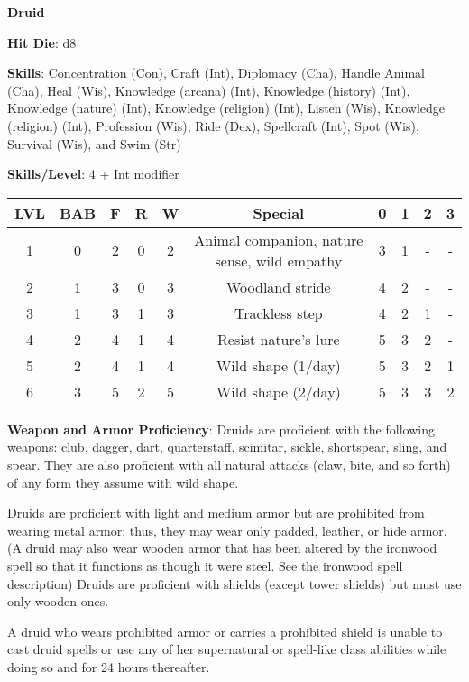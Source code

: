 \textbf{\huge{Druid}}

\textbf{Hit Die}: d8

\textbf{Skills}: Concentration (Con), Craft (Int), Diplomacy (Cha), Handle Animal (Cha), Heal (Wis), Knowledge (arcana) (Int), Knowledge (history) (Int), Knowledge (nature) (Int), Knowledge (religion) (Int), Listen (Wis), Knowledge (religion) (Int), Profession (Wis), Ride (Dex), Spellcraft (Int), Spot (Wis), Survival (Wis), and Swim (Str)

\textbf{Skills/Level}: 4 + Int modifier

\begin{center}
\begin{adjustwidth}{-4cm}{}
\begin{small}
\begin{tabular}{| c | c | c | c | c | c | c | c | c | c |}
\hline
LVL &BAB &F &R &W &Special &0 &1 &2 &3 \\
\hline
1 &0 &2 &0 &2 &Animal companion, nature sense, wild empathy &3 &1 &- &- \\
2 &1 &3 &0 &3 &Woodland stride &4 &2 &- &- \\
3 &1 &3 &1 &3 &Trackless step &4 &2 &1 &- \\
4 &2 &4 &1 &4 &Resist nature's lure &5 &3 &2 &- \\
5 &2 &4 &1 &4 &Wild shape (1/day) &5 &3 &2 &1 \\
6 &3 &5 &2 &5 &Wild shape (2/day) &5 &3 &3 &2 \\
\hline
\end{tabular}
\end{small}
\end{adjustwidth}
\end{center}

\textbf{Weapon and Armor Proficiency}: Druids are proficient with the following weapons: club, dagger, dart, quarterstaff, scimitar, sickle, shortspear, sling, and spear. They are also proficient with all natural attacks (claw, bite, and so forth) of any form they assume with wild shape.

Druids are proficient with light and medium armor but are prohibited from wearing metal armor; thus, they may wear only padded, leather, or hide armor. (A druid may also wear wooden armor that has been altered by the ironwood spell so that it functions as though it were steel. See the ironwood spell description) Druids are proficient with shields (except tower shields) but must use only wooden ones.

A druid who wears prohibited armor or carries a prohibited shield is unable to cast druid spells or use any of her supernatural or spell-like class abilities while doing so and for 24 hours thereafter.

